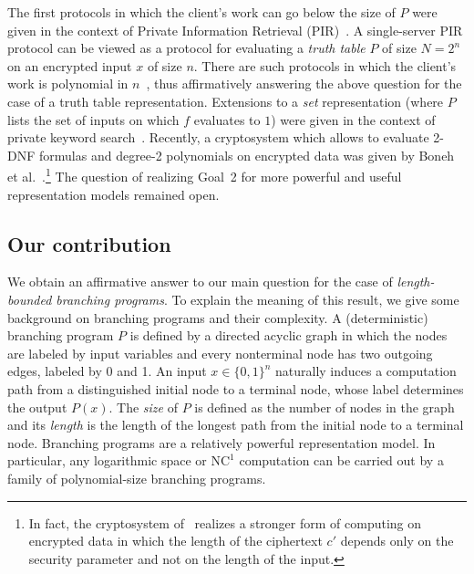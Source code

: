 \documentclass[11pt]{article}
\newcommand{\nc}[1]{{\mathrm{NC}^{#1}}}
\newcommand{\NCone}{{\nc{1}}}
\begin{document}
The first protocols in which the client's work can go below the
size of $P$ were given in the context of Private Information
Retrieval (PIR)~\cite{CGKS95,KO97}. A single-server PIR
protocol can be viewed as a protocol for evaluating a {\em
truth table} $P$ of size $N=2^n$ on an encrypted input $x$ of
size $n$. There are such protocols in which the client's work
is polynomial in $n$~\cite{cms99,L04}, thus affirmatively
answering the above question for the case of a truth table
representation.
Extensions to a {\em set} representation (where $P$ lists the set
of inputs on which $f$ evaluates to $1$) were given in the context
of private keyword search~\cite{KO97,CGN,FIPR05,OS}. Recently, a cryptosystem which allows to evaluate 2-DNF formulas and degree-2
polynomials on encrypted data was given by Boneh et
al.~\cite{BGN}.\footnote{In fact, the cryptosystem of~\cite{BGN} realizes a stronger form of computing on encrypted data in which the length
of the ciphertext $c'$ depends only on the security parameter and
not on the length of the input. } The question of realizing Goal~2
for more powerful and useful representation models remained open.

\subsection{Our contribution}

We obtain an affirmative answer to our main question for the case of
{\em length-bounded branching programs}. To explain the meaning of
this result, we give some background on branching programs and their
complexity. A (deterministic) branching program $P$ is defined by a
directed acyclic graph in which the nodes are labeled by input
variables and every nonterminal node has two outgoing edges, labeled
by 0 and 1. An input $x\in\{0,1\}^n$ naturally induces a computation
path from a distinguished initial node to a terminal node, whose
label determines the output $P(x)$. The {\em size} of $P$ is defined
as the number of nodes in the graph and its {\em length} is the
length of the longest path from the initial node to a terminal node.
Branching programs are a relatively powerful representation model.
In particular, any logarithmic space or $\NCone$ computation can be
carried out by a family of polynomial-size branching programs.
\end{document}
